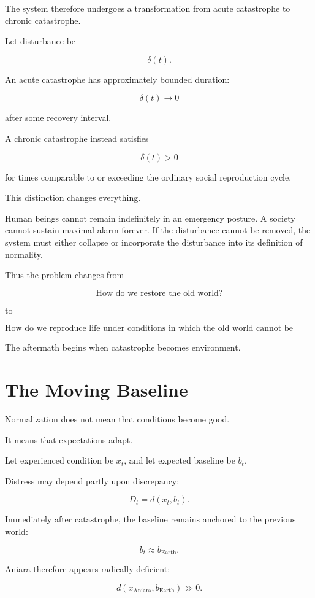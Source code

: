 \documentclass[11pt,oneside]{book}
\theoremstyle{definition}
\theoremstyle{remark}
\begin{document}
The system therefore undergoes a transformation from acute catastrophe to chronic catastrophe.

Let disturbance be

\[
\delta(t).
\]

An acute catastrophe has approximately bounded duration:

\[
\delta(t)\rightarrow0
\]

after some recovery interval.

A chronic catastrophe instead satisfies

\[
\delta(t)>0
\]

for times comparable to or exceeding the ordinary social reproduction cycle.

This distinction changes everything.

Human beings cannot remain indefinitely in an emergency posture. A society cannot sustain maximal alarm forever. If the disturbance cannot be removed, the system must either collapse or incorporate the disturbance into its definition of normality.

Thus the problem changes from

\[
\text{How do we restore the old world?}
\]

to

\[
\text{How do we reproduce life under conditions in which the old world cannot be restored?}
\]

The aftermath begins when catastrophe becomes environment.

\section{The Moving Baseline}

Normalization does not mean that conditions become good.

It means that expectations adapt.

Let experienced condition be \(x_t\), and let expected baseline be \(b_t\).

Distress may depend partly upon discrepancy:

\[
D_t
=
d(x_t,b_t).
\]

Immediately after catastrophe, the baseline remains anchored to the previous world:

\[
b_t\approx b_{\mathrm{Earth}}.
\]

Aniara therefore appears radically deficient:

\[
d(x_{\mathrm{Aniara}},b_{\mathrm{Earth}})
\gg0.
\]
\end{document}
